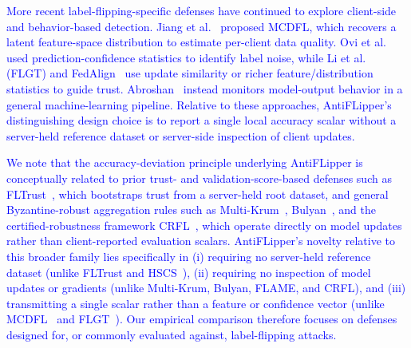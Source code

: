 \documentclass[conference]{IEEEtran}
\begin{document}
\textcolor{blue}{More recent label-flipping-specific defenses have continued to explore client-side and behavior-based detection. Jiang et al.~\cite{jiang2023dataquality} proposed MCDFL, which recovers a latent feature-space distribution to estimate per-client data quality. Ovi et al.~\cite{ovi2023confident} used prediction-confidence statistics to identify label noise, while Li et al.~\cite{li2025flgt} (FLGT) and FedAlign~\cite{fedalign2026} use update similarity or richer feature/distribution statistics to guide trust. Abroshan~\cite{abroshan2025aitoprotect} instead monitors model-output behavior in a general machine-learning pipeline. Relative to these approaches, AntiFLipper's distinguishing design choice is to report a single local accuracy scalar without a server-held reference dataset or server-side inspection of client updates.}

\textcolor{blue}{We note that the accuracy-deviation principle underlying AntiFLipper is conceptually related to prior trust- and validation-score-based defenses such as FLTrust~\cite{cao2020fltrust}, which bootstraps trust from a server-held root dataset, and general Byzantine-robust aggregation rules such as Multi-Krum~\cite{NIPS2017_f4b9ec30}, Bulyan~\cite{mhamdi2018hidden}, and the certified-robustness framework CRFL~\cite{xie2021crfl}, which operate directly on model updates rather than client-reported evaluation scalars. AntiFLipper's novelty relative to this broader family lies specifically in (i) requiring no server-held reference dataset (unlike FLTrust and HSCS~\cite{li2023hscs}), (ii) requiring no inspection of model updates or gradients (unlike Multi-Krum, Bulyan, FLAME, and CRFL), and (iii) transmitting a single scalar rather than a feature or confidence vector (unlike MCDFL~\cite{jiang2023dataquality} and FLGT~\cite{li2025flgt}). Our empirical comparison therefore focuses on defenses designed for, or commonly evaluated against, label-flipping attacks.}
\end{document}
